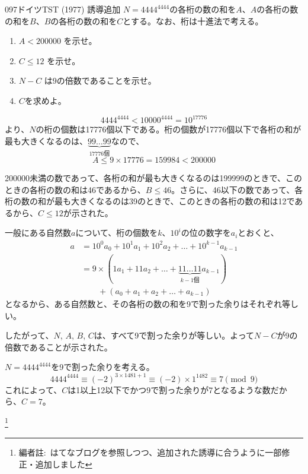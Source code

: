 \begin{prob}{097}{}{ドイツTST (1977) 誘導追加}
 $N=4444^{4444}$の各桁の数の和を$A$、$A$の各桁の数の和を$B$、$B$の各桁の数の和を$C$とする。なお、桁は十進法で考える。
 \begin{enumerate}
  \item $A<200000$ を示せ。
  \item $C\le 12$ を示せ。
  \item $N-C$ は9の倍数であることを示せ。
  \item $C$を求めよ。
 \end{enumerate}
\end{prob}
\[ 4444^{4444}<10000^{4444}=10^{17776} \]
より、$N$の桁の個数は17776個以下である。桁の個数が17776個以下で各桁の和が最も大きくなるのは、$\underbrace{99\dots 99}_{17776\text{個}}$なので、
\[ A\le 9\times 17776 = 159984 < 200000 \]

200000未満の数であって、各桁の和が最も大きくなるのは199999のときで、このときの各桁の数の和は46であるから、$B\le 46$。さらに、46以下の数であって、各桁の数の和が最も大きくなるのは39のときで、このときの各桁の数の和は12であるから、$C\le 12$が示された。

一般にある自然数$a$について、桁の個数を$k$、$10^i$の位の数字を$a_i$とおくと、
\begin{align*}
 a&=10^0a_0+10^1a_1+10^2a_2+\dots+10^{k-1}a_{k-1} \\
 &=9\times(1a_1+11a_2+\dots+\underbrace{11\dots 11}_{k-1\text{個}}a_{k-1}) \\
 &\qquad + (a_0+a_1+a_2+\dots+a_{k-1})
\end{align*}
となるから、ある自然数と、その各桁の数の和を9で割った余りはそれぞれ等しい。

したがって、$N$, $A$, $B$, $C$は、すべて9で割った余りが等しい。よって$N-C$が9の倍数であることが示された。

$N=4444^{4444}$を9で割った余りを考える。
\[ 4444^{4444} \equiv (-2)^{3\times 1481+1} \equiv (-2)\times 1^{1482} \equiv 7 \pmod{9} \]
これによって、$C$は1以上12以下でかつ9で割った余りが7となるような数だから、$C=7$。

\footnote{編者註:~はてなブログを参照しつつ、追加された誘導に合うように一部修正・追加しました}